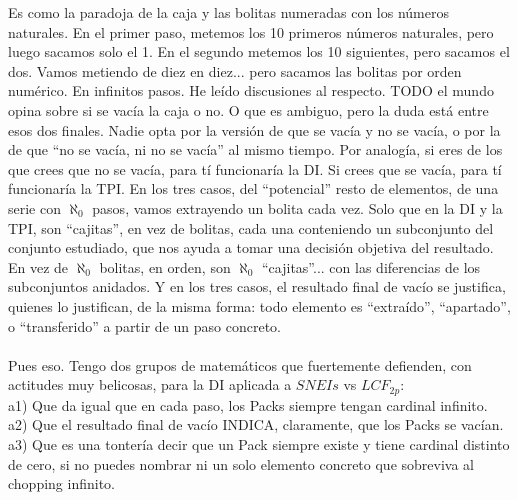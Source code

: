 	\noindent
	Es como la paradoja de la caja y las bolitas numeradas con los números naturales. En el primer paso, metemos los 10 primeros números naturales, pero luego sacamos solo el 1. En el segundo metemos los 10 siguientes, pero sacamos el dos. Vamos metiendo de diez en diez... pero sacamos las bolitas por orden numérico. En infinitos pasos. He leído discusiones al respecto. TODO el mundo opina sobre si se vacía la caja o no. O que es ambiguo, pero la duda está entre esos dos finales. Nadie opta por la versión de que se vacía y no se vacía, o por la de que ``no se vacía, ni no se vacía'' al mismo tiempo. Por analogía, si eres de los que crees que no se vacía, para tí funcionaría la DI. Si crees que se vacía, para tí funcionaría la TPI. En los tres casos, del ``potencial'' resto de elementos, de una serie con $\aleph_{0}$ pasos, vamos extrayendo un bolita cada vez. Solo que en la DI y la TPI, son ``cajitas'', en vez de bolitas, cada una conteniendo un subconjunto del conjunto estudiado, que nos ayuda a tomar una decisión objetiva del resultado. En vez de $\aleph_{0}$ bolitas, en orden, son $\aleph_{0}$ ``cajitas''... con las diferencias de los subconjuntos anidados. Y en los tres casos, el resultado final de vacío se justifica, quienes lo justifican, de la misma forma: todo elemento es ``extraído'', ``apartado'', o ``transferido'' a partir de un paso concreto.
	\\\\
	
	\noindent
	Pues eso. Tengo dos grupos de matemáticos que fuertemente defienden, con actitudes muy belicosas, para la DI aplicada a $SNEIs$ vs $LCF_{2p}$:\\
	a1) Que da igual que en cada paso, los Packs siempre tengan cardinal infinito.\\
	a2) Que el resultado final de vacío INDICA, claramente, que los Packs se vacían.\\
	a3) Que es una tontería decir que un Pack siempre existe y tiene cardinal distinto de cero, si no puedes nombrar ni un solo elemento concreto que sobreviva al chopping infinito.
	\\\\
	
